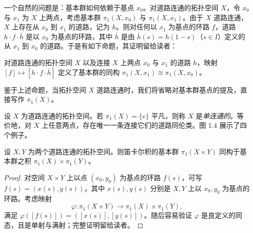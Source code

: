 一个自然的问题是：基本群如何依赖于基点 $x_0$。对道路连通的拓扑空间 $X$，令 $x_0$ 与 $x_1$ 为 $X$ 上两点，考虑基本群 $\pi_1(X,x_0)$ 与 $\pi_1(X,x_1)$。由于 $X$ 道路连通，$X$ 上存在从 $x_0$ 到 $x_1$ 的道路，记为 $h$。则对任何以 $x_1$ 为基点的环路 $f$，道路 $h\cdot f\cdot\bar h$ 是以 $x_0$ 为基点的环路，其中 $\bar h$ 是由 $\bar h(s)=h(1-s)$（$s\in I$）定义的从 $x_1$ 到 $x_0$ 的道路。于是有如下命题，其证明留给读者：

\begin{proposition}[1.13]
对道路连通的拓扑空间 $X$ 以及连接 $X$ 上两点 $x_0$ 与 $x_1$ 的道路 $h$，映射 $[f]\mapsto[h\cdot f\cdot\bar h]$ 定义了基本群的同构 $\pi_1(X,x_1)\cong\pi_1(X,x_0)$。
\end{proposition}



鉴于上述命题，当拓扑空间 $X$ 道路连通时，我们将省略对基本群基点的提及，直接写作 $\pi_1(X)$。

\begin{definition}[1.14]
设 $X$ 为道路连通的拓扑空间。若 $\pi_1(X)=\{e\}$ 平凡，则称 $X$ 是\emph{单连通的}。等价地，对 $X$ 上任意两点，存在唯一一条连接它们的道路同伦类。图 1.4 展示了四个例子。
\end{definition}


\begin{proposition}[1.15]
设 $X,Y$ 为两个道路连通的拓扑空间。则笛卡尔积的基本群 $\pi_1(X\times Y)$ 同构于基本群之积 $\pi_1(X)\times\pi_1(Y)$。
\end{proposition}

\begin{proof}
对空间 $X\times Y$ 上以点 $(x_0,y_0)$ 为基点的环路 $f(s)$，可写 $f(s)=(x(s),y(s))$，其中 $x(s),y(s)$ 分别是 $X,Y$ 上以 $x_0,y_0$ 为基点的环路。考虑映射
\[
\varphi\colon\pi_1(X\times Y)\to\pi_1(X)\times\pi_1(Y),
\]
满足 $\varphi([f(s)])=([x(s)],[y(s)])$。随后容易验证 $\varphi$ 是良定义的同态，且是单射与满射；完整证明留给读者。
\end{proof}

